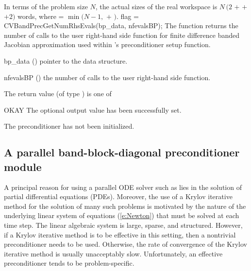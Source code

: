 {
  In terms of the problem size $N$, the actual sizes of the real workspace is
  $N\,(2$  $+$  $+$  $+2)$  words,
  where  = $\min(N-1 ,$  $+$ $)$.
}
{
  flag = CVBandPrecGetNumRhsEvals(bp\_data, nfevalsBP);
}
{
  The function  returns the
  number of calls to the user right-hand side function for
  finite difference banded Jacobian approximation used within
  {\cvbandpre}'s preconditioner setup function.
}
{
  \begin{args}[nfevalsBP]
  \item[bp\_data] ()
    pointer to the {\cvbandpre} data structure.
  \item[nfevalsBP] ()
    the number of calls to the user right-hand side function.
  \end{args}
}
{
  The return value  (of type ) is one of
  \begin{args}[BP\_NO\_DATA]
  \item[OKAY] 
    The optional output value has been successfully set.
  \item[\Id{BP\_NO\_DATA}]
    The {\cvbandpre} preconditioner has not been initialized.
  \end{args}
}
{}

\subsection{A parallel band-block-diagonal preconditioner module}\label{sss:cvbbdpre}

A principal reason for using a parallel ODE solver such as {\cvode} lies
in the solution of partial differential equations (PDEs).  Moreover,
the use of a Krylov iterative method for the solution of many such
problems is motivated by the nature of the underlying linear system of
equations (\ref{e:Newton}) that must be solved at each time step.  The
linear algebraic system is large, sparse, and structured. However, if
a Krylov iterative method is to be effective in this setting, then a
nontrivial preconditioner needs to be used.  Otherwise, the rate of
convergence of the Krylov iterative method is usually unacceptably
slow.  Unfortunately, an effective preconditioner tends to be
problem-specific.

